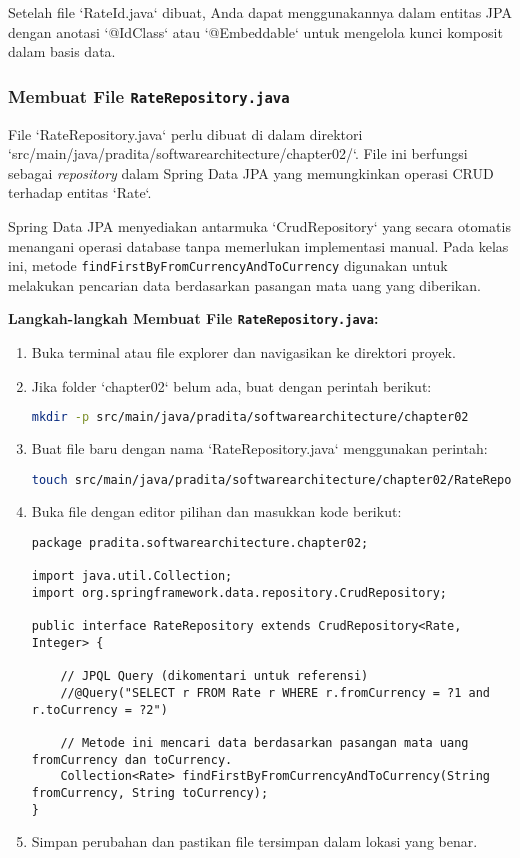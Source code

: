 Setelah file `RateId.java` dibuat, Anda dapat menggunakannya dalam entitas JPA dengan anotasi `@IdClass` atau `@Embeddable` untuk mengelola kunci komposit dalam basis data.


\subsubsection{Membuat File \texttt{RateRepository.java}}
File `RateRepository.java` perlu dibuat di dalam direktori `src/main/java/pradita/softwarearchitecture/chapter02/`. File ini berfungsi sebagai \textit{repository} dalam Spring Data JPA yang memungkinkan operasi CRUD terhadap entitas `Rate`.

Spring Data JPA menyediakan antarmuka `CrudRepository` yang secara otomatis menangani operasi database tanpa memerlukan implementasi manual. Pada kelas ini, metode \texttt{findFirstByFromCurrencyAndToCurrency} digunakan untuk melakukan pencarian data berdasarkan pasangan mata uang yang diberikan.

\textbf{Langkah-langkah Membuat File \texttt{RateRepository.java}:}

\begin{enumerate}
\item Buka terminal atau file explorer dan navigasikan ke direktori proyek.
\item Jika folder `chapter02` belum ada, buat dengan perintah berikut:

\begin{lstlisting}[language=bash]
mkdir -p src/main/java/pradita/softwarearchitecture/chapter02
\end{lstlisting}

\item Buat file baru dengan nama `RateRepository.java` menggunakan perintah:

\begin{lstlisting}[language=bash]
touch src/main/java/pradita/softwarearchitecture/chapter02/RateRepository.java
\end{lstlisting}

\item Buka file dengan editor pilihan dan masukkan kode berikut:

\begin{lstlisting}[style=JavaStyle]
package pradita.softwarearchitecture.chapter02;

import java.util.Collection;
import org.springframework.data.repository.CrudRepository;

public interface RateRepository extends CrudRepository<Rate, Integer> {
	
	// JPQL Query (dikomentari untuk referensi)
	//@Query("SELECT r FROM Rate r WHERE r.fromCurrency = ?1 and r.toCurrency = ?2")
	
	// Metode ini mencari data berdasarkan pasangan mata uang fromCurrency dan toCurrency.
	Collection<Rate> findFirstByFromCurrencyAndToCurrency(String fromCurrency, String toCurrency);
}
\end{lstlisting}

\item Simpan perubahan dan pastikan file tersimpan dalam lokasi yang benar.
\end{enumerate}

